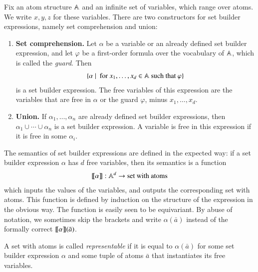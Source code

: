 \begin{definition} Fix an atom  structure $\mathbb A$ and  an infinite set of variables, which range over atoms. We write $x,y,z$ for these variables. There are two constructors for set builder expressions, namely set comprehension and union:
	\begin{enumerate}
		\item {\bf Set comprehension.} Let $\alpha$ be a variable or an already defined set builder expression, and let $\varphi$ be a first-order formula over the vocabulary of $\mathbb A$, which is called the \emph{guard}. Then 
		\begin{align*}
			\{\alpha\ |\ \text{ for } x_1,\ldots,x_d \in \mathbb A \text{ such that } \varphi\} 
		\end{align*}
		is a set builder expression.  The free variables of this expression are the variables that are free in $\alpha$ or the guard $\varphi$, minus $x_1,\ldots,x_d$. 
		
		\item {\bf Union.} If $\alpha_1,\ldots, \alpha_n$ are already defined set builder expressions, then $\alpha_1 \cup \cdots \cup \alpha_n$ is a set builder expression. A variable is free in this expression if it is free in some $\alpha_i$. 
	\end{enumerate}
\end{definition}

The semantics of set builder expressions are defined in the expected way: if a set builder expression $\alpha$ has $d$ free variables, then its semantics is a function 
\begin{align}
	\label{eq:set-builder-semantics}
[\![\alpha]\!] : \mathbb A^d \to  \text{set with atoms}
\end{align}
which inputs the values of the variables, and outputs the corresponding set with atoms. This function is defined by induction on the structure of the expression in the obvious way. The  function is easily seen to be equivariant. By abuse of notation, we sometimes skip the brackets and write $\alpha(\bar a)$ instead of the formally correct $[\![\alpha]\!](\bar a)$.	

\begin{definition}[Representable] \label{def:representable-set-with-atoms}
	A set with atoms is called \emph{representable} if it is equal to $\alpha(\bar a)$ for some set builder expression $\alpha$ and some tuple of atoms $\bar a$ that instantiates its free variables.
\end{definition}

